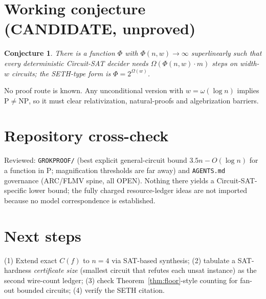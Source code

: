 \documentclass[11pt]{article}
\newtheorem{conj}[thm]{Conjecture}
\begin{document}
\section{Working conjecture (CANDIDATE, unproved)}
\begin{conj}\label{conj:param}
There is a function $\Phi$ with $\Phi(n,w)\to\infty$ superlinearly such that every
deterministic Circuit-SAT decider needs $\Omega(\Phi(n,w)\cdot m)$ steps on width-$w$ circuits;
the SETH-type form is $\Phi=2^{\Omega(w)}$.
\end{conj}
No proof route is known. Any unconditional version with $w=\omega(\log n)$ implies
$\mathrm{P}\ne\mathrm{NP}$, so it must clear relativization, natural-proofs and algebrization barriers.

\section{Repository cross-check}
Reviewed: \texttt{GROKPROOF/} (best explicit general-circuit bound $3.5n-O(\log n)$ for a
function in P; magnification thresholds are far away) and \texttt{AGENTS.md} governance (ARC/FLMV
spine, all OPEN). Nothing there yields a Circuit-SAT-specific lower bound; the fully charged
resource-ledger ideas are not imported because no model correspondence is established.

\section{Next steps}
(1) Extend exact $C(f)$ to $n=4$ via SAT-based synthesis; (2) tabulate a SAT-hardness
\emph{certificate size} (smallest circuit that refutes each unsat instance) as the second
wire-count ledger; (3) check Theorem~\ref{thm:floor}-style counting for fan-out bounded
circuits; (4) verify the SETH citation.
\end{document}

